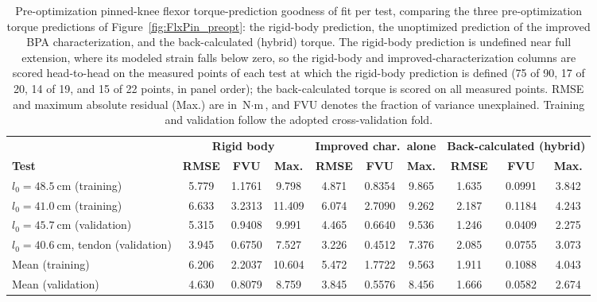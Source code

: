 \begin{table}[htbp]
\caption{Pre-optimization pinned-knee flexor torque-prediction goodness of fit per test, comparing the three pre-optimization torque predictions of Figure~\ref{fig:FlxPin_preopt}: the rigid-body prediction, the unoptimized prediction of the improved BPA characterization, and the back-calculated (hybrid) torque. The rigid-body prediction is undefined near full extension, where its modeled strain falls below zero, so the rigid-body and improved-characterization columns are scored head-to-head on the measured points of each test at which the rigid-body prediction is defined (75 of 90, 17 of 20, 14 of 19, and 15 of 22 points, in panel order); the back-calculated torque is scored on all measured points. RMSE and maximum absolute residual (Max.) are in $\text{N}\cdot\text{m}$, and FVU denotes the fraction of variance unexplained. Training and validation follow the adopted cross-validation fold.}
\label{tab:FlxPinPreGof}
\fontsize{10pt}{12pt}\selectfont
\begin{tabular}{@{}lccccccccc@{}}
\toprule
& \multicolumn{3}{c}{\textbf{Rigid body}} & \multicolumn{3}{c}{\textbf{Improved char.\ alone}} & \multicolumn{3}{c}{\textbf{Back-calculated (hybrid)}} \\
\cmidrule(lr){2-4} \cmidrule(lr){5-7} \cmidrule(l){8-10}
\textbf{Test} & \textbf{RMSE} & \textbf{FVU} & \textbf{Max.} & \textbf{RMSE} & \textbf{FVU} & \textbf{Max.} & \textbf{RMSE} & \textbf{FVU} & \textbf{Max.} \\
\midrule
$l_{0}=\qty{48.5}{\cm}$ (training)           & 5.779 & 1.1761 & 9.798 & 4.871 & 0.8354 & 9.865 & 1.635 & 0.0991 & 3.842 \\
$l_{0}=\qty{41.0}{\cm}$ (training)           & 6.633 & 3.2313 & 11.409 & 6.074 & 2.7090 & 9.262 & 2.187 & 0.1184 & 4.243 \\
$l_{0}=\qty{45.7}{\cm}$ (validation)         & 5.315 & 0.9408 & 9.991 & 4.465 & 0.6640 & 9.536 & 1.246 & 0.0409 & 2.275 \\
$l_{0}=\qty{40.6}{\cm}$, tendon (validation) & 3.945 & 0.6750 & 7.527 & 3.226 & 0.4512 & 7.376 & 2.085 & 0.0755 & 3.073 \\
\midrule
Mean (training)                             & 6.206 & 2.2037 & 10.604 & 5.472 & 1.7722 & 9.563 & 1.911 & 0.1088 & 4.043 \\
Mean (validation)                           & 4.630 & 0.8079 & 8.759 & 3.845 & 0.5576 & 8.456 & 1.666 & 0.0582 & 2.674 \\
\bottomrule
\end{tabular}
\end{table}

